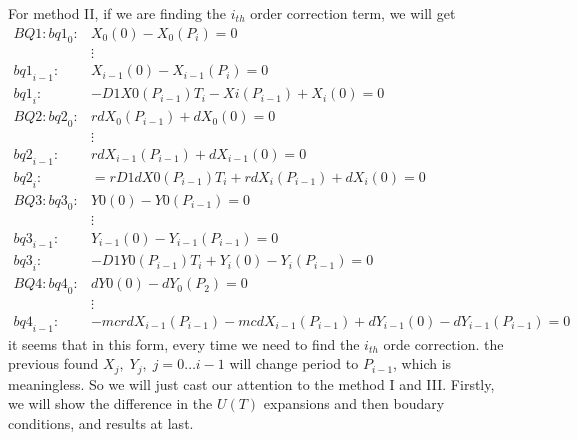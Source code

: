 \documentclass{article}
\begin{document}
 For method II,  if we are finding the $i_{th}$ order correction term, we will get 
 \begin{align*}
 BQ1:
 {bq1}_{0}:& {X_0} \! \left(0\right)-{X_0} \! \left(P_{i}\right)=0\\
&\vdots \\
{bq1}_{i-1}:& {X_{i-1}} \! \left(0\right)-{X_{i-1}} \! \left(P_{i}\right)=0\\
{bq1}_{i}:& -{D1X0} \! \left(P_{i-1}\right) T_{i}-{Xi} \! \left(P_{i-1}\right)+{X_i} \! \left(0\right)=0\\ 
BQ2:
{bq2}_{0}:& r {dX_0} \! \left(P_{i-1}\right)+{dX_0} \! \left(0\right)=0\\
& \vdots\\
{bq2}_{i-1}:& r {dX_{i-1}} \! \left(P_{i-1}\right)+{dX_{i-1}} \! \left(0\right)=0\\
{bq2}_{i}: &=r {D1dX0} \! \left(P_{i-1}\right) T_{i}+r {dX_i} \! \left(P_{i-1}\right)+{dX_i} \! \left(0\right)=0\\
BQ3:
{bq3}_{0}:&{Y0} \! \left(0\right)-{Y0} \! \left(P_{i-1}\right)=0\\
&\vdots \\
{bq3}_{i-1}:&{Y_{i-1}} \! \left(0\right)-{Y_{i-1}} \! \left(P_{i-1}\right)=0\\
{bq3}_{i}:&-{D1Y0} \! \left(P_{i-1}\right) T_{i}+{Y_i} \! \left(0\right)-{Y_i} \! \left(P_{i-1}\right)=0\\
BQ4:
{bq4}_{0}:&{dY0} \! \left(0\right)-{dY_0} \! \left(P_{2}\right)=0\\
&\vdots\\
{bq4}_{i-1}:&-{mc} r {dX_{i-1}} \! \left(P_{i-1}\right)-{mc} {dX_{i-1}} \! \left(P_{i-1}\right)+{dY_{i-1}} \! \left(0\right)-{dY_{i-1}} \! \left(P_{i-1}\right)=0
 \end{align*}
 it seems that in this form, every time we need to find the $i_{th}$ orde correction. the previous found $X_j,\; Y_j,\; j=0 \ldots i-1$ will change period to $P_{i-1}$, which is meaningless. So we will just cast our attention to the method I and III.
 Firstly, we will show the difference in the $U(T)$ expansions and then boudary conditions, and results at last.
\end{document}
